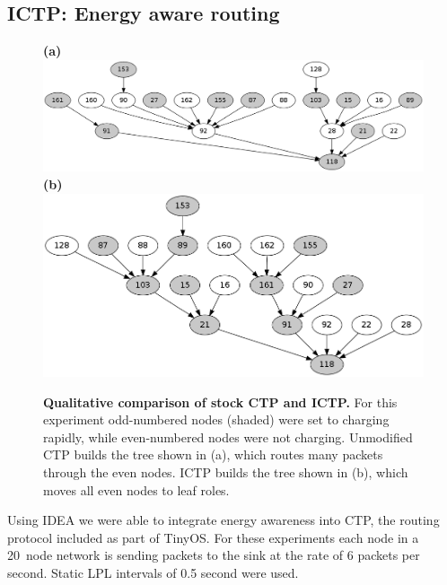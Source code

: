 \subsection{ICTP: Energy aware routing}

\begin{figure}[t]
\begin{center}
\textbf{(a)}\\
\includegraphics[width=\hsize]{./figs/STOCK.png}\\
\textbf{(b)}\\
\includegraphics[width=\hsize]{./figs/ICTP.png}\\
\end{center}
\caption{\small{\textbf{Qualitative comparison of stock CTP and ICTP.}
For this experiment odd-numbered nodes (shaded) were set to charging rapidly,
while even-numbered nodes were not charging. Unmodified CTP builds the tree
shown in (a), which routes many packets through the even nodes. ICTP builds
the tree shown in (b), which moves all even nodes to leaf roles.}}
\label{fig-ictpqualitative}
\end{figure}

Using IDEA we were able to integrate energy awareness into CTP, the routing
protocol included as part of TinyOS. For these experiments each node in a
20~node network is sending packets to the sink at the rate of 6 packets per
second. Static LPL intervals of 0.5 second were used. 

